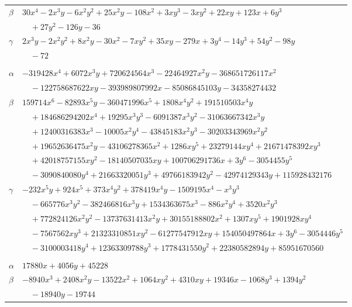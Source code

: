 \documentclass[11pt]{article}
\begin{document}
\begin{longtable}{@{}ll@{}}
$\beta$ & $30x^{4}-2x^{3}y-6x^{2}y^{2}+25x^{2}y-108x^{2}+3xy^{3}-3xy^{2}+22xy+123x+6y^{3}$\\
 & $\quad +27y^{2}-126y-36$\\
$\gamma$ & $2x^{3}y-2x^{2}y^{2}+8x^{2}y-30x^{2}-7xy^{2}+35xy-279x+3y^{4}-14y^{3}+54y^{2}-98y$\\
 & $\quad -72$\\
\addlinespace[3pt]
\multicolumn{2}{@{}l}{$\{i,j\}=\{4,149\}$, $k_{ij}=2^{4}\cdot 3^{4}\cdot 5^{5}\cdot 7^{4}\cdot 19$}\\
$\alpha$ & $-319428x^{4}+6072x^{3}y+720624564x^{3}-22464927x^{2}y-368651726117x^{2}$\\
 & $\quad -122758687622xy-393989807992x-85086845103y-34358274432$\\
$\beta$ & $159714x^{6}-82893x^{5}y-360471996x^{5}+1808x^{4}y^{2}+191510503x^{4}y$\\
 & $\quad +184686294202x^{4}+19295x^{3}y^{3}-6091387x^{3}y^{2}-31063667342x^{3}y$\\
 & $\quad +12400316383x^{3}-10005x^{2}y^{4}-43845183x^{2}y^{3}-30203343969x^{2}y^{2}$\\
 & $\quad +19652636475x^{2}y-43106278365x^{2}+1286xy^{5}+23279144xy^{4}+21671478392xy^{3}$\\
 & $\quad +42018757155xy^{2}-18140507035xy+100706291736x+3y^{6}-3054455y^{5}$\\
 & $\quad -3090840080y^{4}+21663320051y^{3}+49766183942y^{2}-42974129343y+115928432176$\\
$\gamma$ & $-232x^{5}y+924x^{5}+373x^{4}y^{2}+378419x^{4}y-1509195x^{4}-x^{3}y^{3}$\\
 & $\quad -665776x^{3}y^{2}-382466816x^{3}y+1534363675x^{3}-886x^{2}y^{4}+3520x^{2}y^{3}$\\
 & $\quad +772824126x^{2}y^{2}-13737631413x^{2}y+30155188802x^{2}+1307xy^{5}+1901928xy^{4}$\\
 & $\quad -7567562xy^{3}+21323310851xy^{2}-61277547912xy+154050497864x+3y^{6}-3054446y^{5}$\\
 & $\quad -3100003418y^{4}+12363309788y^{3}+1778431550y^{2}+22380582894y+85951670560$\\
\addlinespace[3pt]
\multicolumn{2}{@{}l}{$\{i,j\}=\{4,206\}$, $k_{ij}=2^{3}\cdot 3^{5}\cdot 7^{2}$}\\
$\alpha$ & $17880x+4056y+45228$\\
$\beta$ & $-8940x^{3}+2408x^{2}y-13522x^{2}+1064xy^{2}+4310xy+19346x-1068y^{3}+1394y^{2}$\\
 & $\quad -18940y-19744$\\

\end{longtable}
\end{document}
